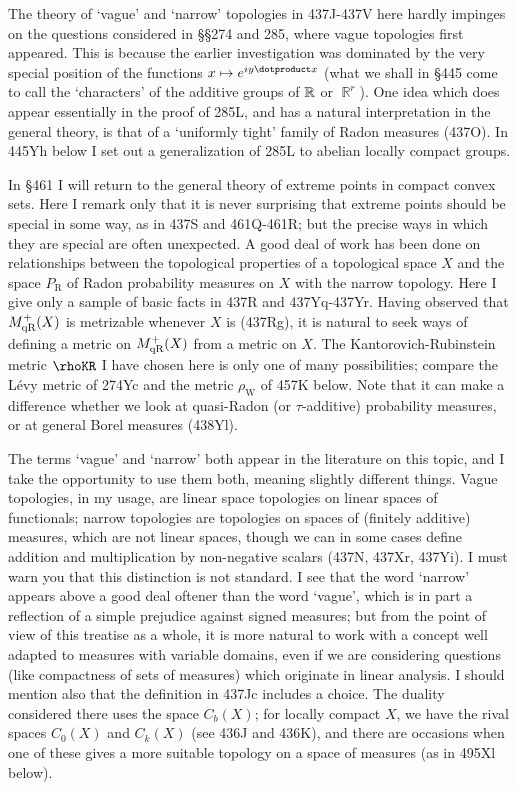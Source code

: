 {The theory of `vague' and `narrow' topologies in 437J-437V here hardly
impinges on
the questions considered in \S\S274 and 285, where vague topologies
first appeared.   This is because the earlier investigation was
dominated by the very special position of the functions
$x\mapsto e^{iy\dotproduct x}$ (what we shall in \S445 come to call the
`characters' of the additive groups of $\Bbb R$ or $\BbbR^r$).   One
idea which does appear essentially in the proof of 285L, and has a
natural interpretation in the general theory, is that of a `uniformly
tight' family of Radon measures (437O).   In 445Yh below I
set out a generalization of 285L to abelian locally compact groups.

In \S461 I will return to the general theory of extreme points in
compact convex sets.   Here I remark only that it is never surprising
that extreme points should be
special in some way, as in 437S and 461Q-461R;
but the precise ways in which they are special are often unexpected.
A good deal of work has been done on relationships between the
topological properties of a topological space $X$ and the space
$P_{\text{R}}$ of Radon probability measures on $X$ with the
narrow topology.   Here I give only a sample of basic facts in 437R
and 437Yq-437Yr.   Having observed that $M^+_{\text{qR}}(X)$ is metrizable
whenever $X$ is (437Rg), it is natural to seek ways of defining a metric on
$M^+_{\text{qR}}(X)$ from a metric on $X$.   The Kantorovich-Rubinstein metric
$\rhoKR$ I have
chosen here is only one of many possibilities;  compare the L\'evy metric
of 274Yc and the metric $\rho_{\text{W}}$ of 457K below.   Note that it can
make a difference whether we look at quasi-Radon (or $\tau$-additive)
probability measures, or at general Borel measures (438Yl).

The terms `vague' and `narrow' both appear in the literature on this
topic, and I take the opportunity to use them both, meaning slightly
different things.   Vague topologies,
in my usage, are linear space topologies on linear spaces of
functionals;  narrow topologies are topologies on spaces of (finitely
additive) measures, which are not linear spaces, though we can
in some cases define addition and multiplication by non-negative
scalars (437N, 437Xr, 437Yi).
I must warn you that this distinction is not standard.   I see that the
word `narrow' appears above
a good deal oftener than the word `vague', which
is in part a reflection of
a simple prejudice against signed measures;  but from the point of view
of this treatise as a whole, it is more natural to work with a concept
well adapted to measures with
variable domains, even if we are considering questions (like compactness
of sets of measures) which originate in linear analysis.
I should mention also that the definition in 437Jc includes a choice.
The duality considered there uses the space $C_b(X)$;  for locally
compact $X$, we have the rival spaces $C_0(X)$ and $C_k(X)$ (see 436J
and 436K), and there are occasions when one of these gives a more
suitable topology on a space of measures (as in 495Xl below).

}
